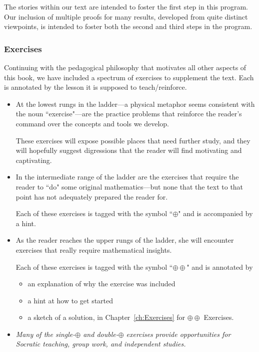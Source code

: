 \medskip

The stories within our text are intended to foster the first step in this program.  Our inclusion of  multiple proofs for many results, developed from quite distinct viewpoints, is intended to foster both the second and third steps in the program. 

\subsubsection{Exercises}

Continuing with the pedagogical philosophy that motivates all other aspects of this book, we have included a spectrum of exercises to supplement the text.  Each is annotated by the lesson it is supposed to teach/reinforce.
\begin{itemize}
\item
At the lowest rungs in the ladder---a physical metaphor seems consistent with the noun ``exercise"---are the practice problems that reinforce the reader's command over the concepts and tools we develop.

These exercises will expose possible places that need further study, and they will hopefully suggest digressions that the reader will find motivating and captivating.

\medskip\item
In the intermediate range of the ladder are the exercises that require the reader to ``do" some original mathematics---but none that the text to that point has not adequately prepared the reader for. 

Each of these exercises is tagged with the symbol ``$\oplus$" and is accompanied by a hint.

\medskip\item
As the reader reaches the upper rungs of the ladder, she will encounter exercises that really require mathematical insights.

Each of these exercises is tagged with the symbol ``$\oplus \oplus$" and is annotated by
  \begin{itemize}
  \item
an explanation of why the exercise was included
  \medskip\item
a hint at how to get started
  \medskip\item
a sketch of a solution, in Chapter~\ref{ch:Exercises} for $\oplus \oplus$ Exercises.
  \end{itemize} 

\medskip\item
{\em Many of the single-$\oplus$ and double-$\oplus$ exercises provide opportunities for Socratic teaching, group work, and independent studies.} 


\end{itemize}
